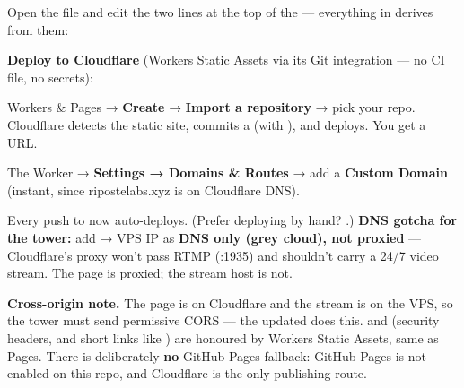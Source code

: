 \documentclass[fontpath=fonts/,logopath=logo/]{riposte-doc}
\begin{document}
\begin{ripnumbers}
\item Open the file and edit the two lines at the top of the  — everything in  derives from them: 
\item \textbf{Deploy to Cloudflare} (Workers Static Assets via its Git integration — no CI file, no secrets):
\begin{ripbullets}
\item Workers \& Pages → \textbf{Create} → \textbf{Import a repository} → pick your repo. Cloudflare detects the static site, commits a  (with ), and deploys. You get a  URL.
\item The Worker → \textbf{Settings → Domains \& Routes} → add a \textbf{Custom Domain}  (instant, since ripostelabs.xyz is on Cloudflare DNS).
\item Every push to  now auto-deploys. (Prefer deploying by hand? .) \textbf{DNS gotcha for the tower:} add  → VPS IP as \textbf{DNS only (grey cloud), not proxied} — Cloudflare's proxy won't pass RTMP (:1935) and shouldn't carry a 24/7 video stream. The page is proxied; the stream host is not.
\end{ripbullets}

\item \textbf{Cross-origin note.} The page is on Cloudflare and the stream is on the VPS, so the tower must send permissive CORS — the updated  does this.  and  (security headers, and short links like ) are honoured by Workers Static Assets, same as Pages. There is deliberately \textbf{no} GitHub Pages fallback: GitHub Pages is not enabled on this repo, and Cloudflare is the only publishing route.
\end{ripnumbers}


\end{document}
